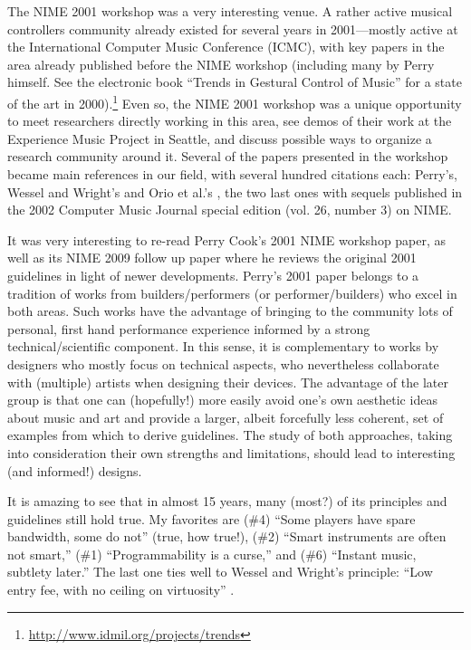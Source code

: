 The NIME 2001 workshop was a very interesting venue. A rather active musical controllers community already existed for several years in 2001—mostly active at the International Computer Music Conference (ICMC), with key papers in the area already published before the NIME workshop (including many by Perry himself. See the electronic book ``Trends in Gestural Control of Music'' for a state of the art in 2000).\footnote{\url{http://www.idmil.org/projects/trends}} Even so, the NIME 2001 workshop was a unique opportunity to meet researchers directly working in this area, see demos of their work at the Experience Music Project in Seattle, and discuss possible ways to organize a research community around it. Several of the papers presented in the workshop became main references in our field, with several hundred citations each: Perry's, Wessel and Wright's \cite{Wessel:2001} and Orio et al.'s \cite{Orio:2001}, the two last ones with sequels published in the 2002 Computer Music Journal special edition (vol. 26, number 3) on NIME.

It was very interesting to re-read Perry Cook's 2001 NIME workshop paper, as well as its NIME 2009 follow up paper where he reviews the original 2001 guidelines in light of newer developments. Perry's 2001 paper belongs to a tradition of works from builders/performers (or performer/builders) who excel in both areas. Such works have the advantage of bringing to the community lots of personal, first hand performance experience informed by a strong technical/scientific component. In this sense, it is complementary to works by designers who mostly focus on technical aspects, who nevertheless collaborate with (multiple) artists when designing their devices. The advantage of the later group is that one can (hopefully!) more easily avoid one's own aesthetic ideas about music and art and provide a larger, albeit forcefully less coherent, set of examples from which to derive guidelines. The study of both approaches, taking into consideration their own strengths and limitations, should lead to interesting (and informed!) designs. 


It is amazing to see that in almost 15 years, many (most?) of its principles and guidelines still hold true. My favorites are (\#4) ``Some players have spare bandwidth, some do not'' (true, how true!), (\#2) ``Smart instruments are often not smart,'' (\#1) ``Programmability is a curse,'' and (\#6) ``Instant music, subtlety later.'' The last one ties well to Wessel and Wright's principle: ``Low entry fee, with no ceiling on virtuosity'' \cite{Wessel:2001}.



